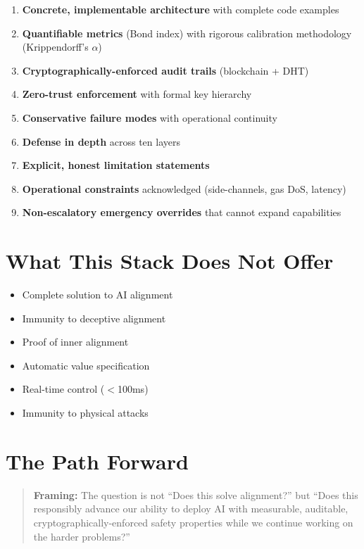 \documentclass[11pt,letterpaper]{article}
\theoremstyle{definition}
\theoremstyle{remark}
\begin{document}
\begin{enumerate}
\item \textbf{Concrete, implementable architecture} with complete code examples
\item \textbf{Quantifiable metrics} (Bond index) with rigorous calibration methodology (Krippendorff's $\alpha$)
\item \textbf{Cryptographically-enforced audit trails} (blockchain + DHT)
\item \textbf{Zero-trust enforcement} with formal key hierarchy
\item \textbf{Conservative failure modes} with operational continuity
\item \textbf{Defense in depth} across ten layers
\item \textbf{Explicit, honest limitation statements}
\item \textbf{Operational constraints} acknowledged (side-channels, gas DoS, latency)
\item \textbf{Non-escalatory emergency overrides} that cannot expand capabilities
\end{enumerate}

\section{What This Stack Does Not Offer}

\begin{itemize}
\item Complete solution to AI alignment
\item Immunity to deceptive alignment
\item Proof of inner alignment
\item Automatic value specification
\item Real-time control ($<$100ms)
\item Immunity to physical attacks
\end{itemize}

\section{The Path Forward}

\begin{quote}
\textbf{Framing:} The question is not ``Does this solve alignment?'' but ``Does this responsibly advance our ability to deploy AI with measurable, auditable, cryptographically-enforced safety properties while we continue working on the harder problems?''
\end{quote}
\end{document}
